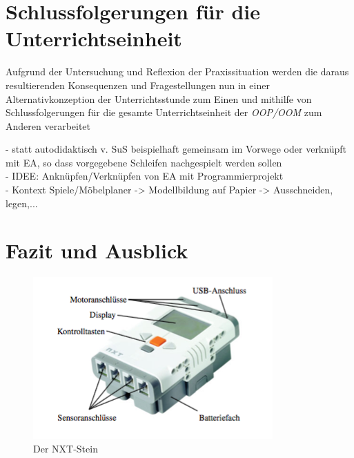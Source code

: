 \documentclass[paper=a4, DIV=13, BCOR=12mm, twoside=on, onecolumn=on, open = any, titlepage =on, parskip =half-, headsepline = on, footsepline = on, chapterprefix = on, sectionprefix = on, appendixprefix = off, fontsize = 11pt, numbers = noenddot, abstract = off]{scrreprt}
\begin{document}
\par \singlespacing
\chapter{Schlussfolgerungen für die Unterrichtseinheit}
\onehalfspacing

Aufgrund der Untersuchung und Reflexion der Praxissituation werden die daraus resultierenden Konsequenzen und Fragestellungen nun in einer Alternativkonzeption der Unterrichtsstunde zum Einen und mithilfe von Schlussfolgerungen für die gesamte Unterrichtseinheit der \emph{OOP/OOM} zum Anderen verarbeitet 

- statt autodidaktisch v. SuS beispielhaft gemeinsam im Vorwege oder verknüpft mit EA, so dass vorgegebene Schleifen nachgespielt werden sollen\\
- IDEE: Anknüpfen/Verknüpfen von EA mit Programmierprojekt\\
- Kontext Spiele/Möbelplaner -> Modellbildung auf Papier -> Ausschneiden, legen,...


\newpage
\chapter{Fazit und Ausblick}
\onehalfspacing

\begin{figure}[htb]
\centering
\includegraphics[scale=0.7]{images/NXT-Stein.png} 
\caption[Der NXT-Stein]{Der NXT-Stein \cite[S. 42]{berns:10}}
\label{fig:NXT Stein}
\end{figure}
\end{document}
